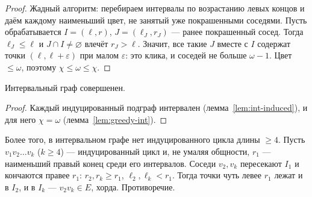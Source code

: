 \begin{proof}
Жадный алгоритм: перебираем интервалы по возрастанию левых концов и даём
каждому наименьший цвет, не занятый уже покрашенными соседями. Пусть
обрабатывается \(I=(\ell,r)\), \(J=(\ell_J,r_J)\) — ранее покрашенный сосед. Тогда
\(\ell_J\le\ell\) и \(J\cap I\ne\varnothing\) влечёт \(r_J>\ell\). Значит, все такие \(J\) вместе с \(I\)
содержат точки \((\ell,\ell+\varepsilon)\) при малом \(\varepsilon\): это клика, и соседей не больше
\(\omega-1\). Цвет \(\le\omega\), поэтому \(\chi\le\omega\le\chi\).
\end{proof}
\begin{theorem}
Интервальный граф совершенен.
\end{theorem}
\begin{proof}
Каждый индуцированный подграф интервален (лемма~\ref{lem:int-induced}), и для него \(\chi=\omega\) (лемма~\ref{lem:greedy-int}).
\end{proof}
\begin{example}[\(C_n\), \(n\ge4\), не интервален]
Более того, в интервальном графе нет индуцированного цикла длины \(\ge4\). Пусть
\(v_1v_2\ldots v_k\) (\(k\ge4\)) — индуцированный цикл и, не умаляя общности, \(r_1\) —
наименьший правый конец среди его интервалов. Соседи \(v_2,v_k\) пересекают \(I_1\) и
кончаются правее \(r_1\): \(r_2,r_k\ge r_1\), \(\ell_2,\ell_k<r_1\). Тогда точки чуть левее \(r_1\)
лежат и в \(I_2\), и в \(I_k\) — \(v_2v_k\in E\), хорда. Противоречие.
\end{example}


